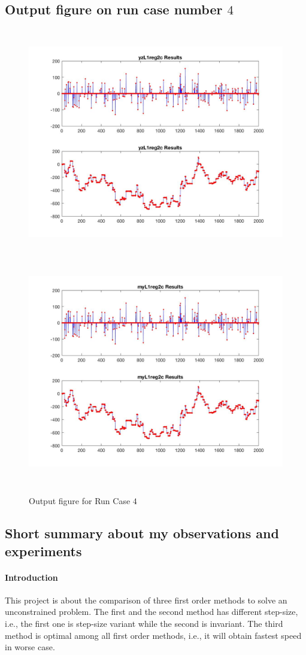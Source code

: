 \subsection{Output figure on run case number $4$}
\begin{figure}[H]
\centering
\includegraphics[height=10cm]{p_5}
\includegraphics[height=10cm]{p_6}
\caption{Output figure for Run Case $4$}
\end{figure}
\subsection{Short summary about my observations and experiments}
\paragraph{Introduction} This project is about the comparison of three first order methods to solve an unconstrained problem. The first and the second method has different step-size, i.e., the first one is step-size variant while the second is invariant. The third method is optimal among all first order methods, i.e., it will obtain fastest speed in worse case.

